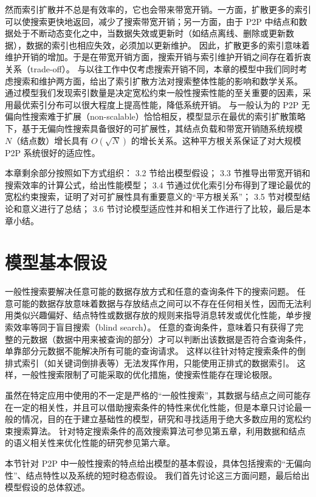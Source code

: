 \documentclass[degree=doctor]{thuthesis}
\begin{document}
然而索引扩散并不总是有效率的，它也会带来带宽开销。一方面，扩散更多的索引可以使搜索更快地返回，减少了搜索带宽开销；另一方面，由于 P2P 中结点和数据处于不断动态变化之中，当数据失效或更新时（如结点离线、删除或更新数据），数据的索引也相应失效，必须加以更新维护。
因此，扩散更多的索引意味着维护开销的增加。于是在带宽开销方面，搜索开销与索引维护开销之间存在着折衷关系（trade-off）。
与以往工作中仅考虑搜索开销不同，本章的模型中我们同时考虑搜索和维护两方面，给出了索引扩散方法对搜索整体性能的影响和数学关系。
通过模型我们发现索引数量是决定宽松约束一般性搜索性能的至关重要的因素，采用最优索引分布可以很大程度上提高性能，降低系统开销。
与一般认为的 P2P 无偏向性搜索难于扩展（non-scalable）恰恰相反，模型显示在最优的索引扩散策略下，基于无偏向性搜索具备很好的可扩展性，其结点负载和带宽开销随系统规模 $N$（结点数）增长具有 $O(\sqrt{N})$ 的增长关系。这种平方根关系保证了对大规模 P2P 系统很好的适应性。

本章剩余部分按照如下方式组织：
3.2 节给出模型假设；
3.3 节推导出带宽开销和搜索效率的计算公式，给出性能模型；
3.4 节通过优化索引分布得到了理论最优的宽松约束搜索，证明了对可扩展性具有重要意义的“平方根关系”；
3.5 节对模型结论和意义进行了总结；
3.6 节讨论模型适应性并和相关工作进行了比较，最后是本章小结。


\section{模型基本假设}

一般性搜索要解决任意可能的数据存放方式和任意的查询条件下的搜索问题。
任意可能的数据存放意味着数据与存放结点之间可以不存在任何相关性，因而无法利用类似兴趣偏好、结点特性或数据存放的规则来指导消息转发或优化性能，单步搜索效率等同于盲目搜索（blind search）。
任意的查询条件，意味着只有获得了完整的元数据（数据中用来被查询的部分）才可以判断出该数据是否符合查询条件，单靠部分元数据不能解决所有可能的查询请求。
这样以往针对特定搜索条件的倒排式索引（如关键词倒排表等）无法发挥作用，只能使用正排式的数据索引。
这样，一般性搜索限制了可能采取的优化措施，使搜索性能存在理论极限。

虽然在特定应用中使用的不一定是严格的“一般性搜索”，其数据与结点之间可能存在一定的相关性，并且可以借助搜索条件的特性来优化性能，但是本章只讨论最一般的情况，目的在于建立基础性的模型，研究和寻找适用于绝大多数应用的宽松约束搜索算法。
针对特定搜索条件的高效搜索算法可参见第五章，利用数据和结点的语义相关性来优化性能的研究参见第六章。

本节针对 P2P 中一般性搜索的特点给出模型的基本假设，具体包括搜索的“无偏向性”、结点特性以及系统的短时稳态假设。
我们首先讨论这三方面问题，最后给出模型假设的总体叙述。
\end{document}
